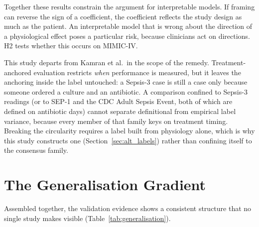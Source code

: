 Together these results constrain the argument for interpretable models. If
framing can reverse the sign of a coefficient, the coefficient reflects the
study design as much as the patient. An interpretable model that is wrong about
the direction of a physiological effect poses a particular risk, because
clinicians act on directions. H2 tests whether this occurs on
MIMIC-IV.

This study departs from Kamran et al.\ in the scope of the remedy.
Treatment-anchored evaluation restricts \emph{when} performance is measured,
but it leaves the anchoring inside the label untouched: a Sepsis-3 case is
still a case only because someone ordered a culture and an antibiotic. A
comparison confined to Sepsis-3 readings (or to SEP-1 and the CDC Adult
Sepsis Event, both of which are defined on antibiotic days) cannot separate
definitional from empirical label variance, because every member of that family
keys on treatment timing. Breaking the circularity requires a label built from
physiology alone, which is why this study constructs one
(Section~\ref{sec:alt_labels}) rather than confining itself to the consensus
family.


\section{The Generalisation Gradient}
\label{sec:generalisation}

Assembled together, the validation evidence shows a consistent structure that
no single study makes visible (Table~\ref{tab:generalisation}).

